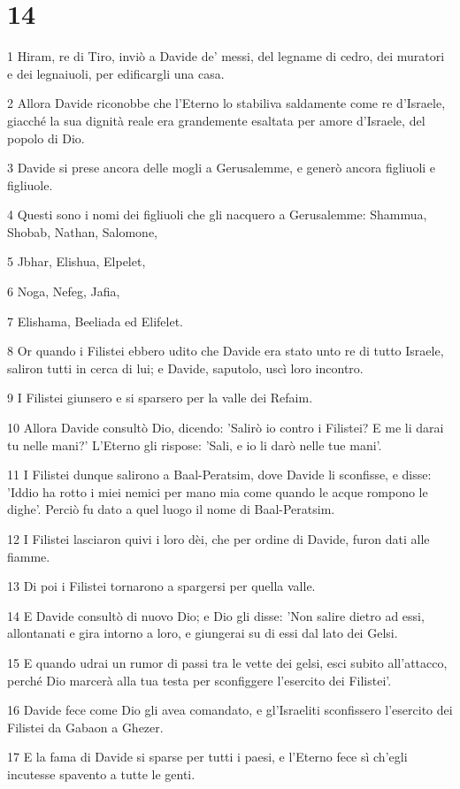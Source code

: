 \chapter{14}

\par 1 Hiram, re di Tiro, inviò a Davide de' messi, del legname di cedro, dei muratori e dei legnaiuoli, per edificargli una casa.
\par 2 Allora Davide riconobbe che l'Eterno lo stabiliva saldamente come re d'Israele, giacché la sua dignità reale era grandemente esaltata per amore d'Israele, del popolo di Dio.
\par 3 Davide si prese ancora delle mogli a Gerusalemme, e generò ancora figliuoli e figliuole.
\par 4 Questi sono i nomi dei figliuoli che gli nacquero a Gerusalemme: Shammua, Shobab, Nathan, Salomone,
\par 5 Jbhar, Elishua, Elpelet,
\par 6 Noga, Nefeg, Jafia,
\par 7 Elishama, Beeliada ed Elifelet.
\par 8 Or quando i Filistei ebbero udito che Davide era stato unto re di tutto Israele, saliron tutti in cerca di lui; e Davide, saputolo, uscì loro incontro.
\par 9 I Filistei giunsero e si sparsero per la valle dei Refaim.
\par 10 Allora Davide consultò Dio, dicendo: 'Salirò io contro i Filistei? E me li darai tu nelle mani?' L'Eterno gli rispose: 'Sali, e io li darò nelle tue mani'.
\par 11 I Filistei dunque salirono a Baal-Peratsim, dove Davide li sconfisse, e disse: 'Iddio ha rotto i miei nemici per mano mia come quando le acque rompono le dighe'. Perciò fu dato a quel luogo il nome di Baal-Peratsim.
\par 12 I Filistei lasciaron quivi i loro dèi, che per ordine di Davide, furon dati alle fiamme.
\par 13 Di poi i Filistei tornarono a spargersi per quella valle.
\par 14 E Davide consultò di nuovo Dio; e Dio gli disse: 'Non salire dietro ad essi, allontanati e gira intorno a loro, e giungerai su di essi dal lato dei Gelsi.
\par 15 E quando udrai un rumor di passi tra le vette dei gelsi, esci subito all'attacco, perché Dio marcerà alla tua testa per sconfiggere l'esercito dei Filistei'.
\par 16 Davide fece come Dio gli avea comandato, e gl'Israeliti sconfissero l'esercito dei Filistei da Gabaon a Ghezer.
\par 17 E la fama di Davide si sparse per tutti i paesi, e l'Eterno fece sì ch'egli incutesse spavento a tutte le genti.

